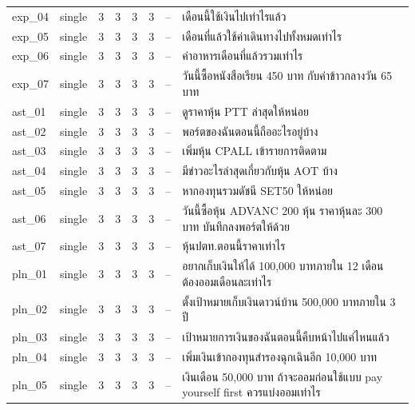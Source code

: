 \documentclass[11pt,a4paper]{article}
\begin{document}
{\begin{longtable}{llrrrrrp{7.2cm}}
exp\_\allowbreak{}04 & single & 3 & 3 & 3 & 3 & -- & {\thaifont เดือนนี้ใช้เงินไปเท่าไรแล้ว} \\
exp\_\allowbreak{}05 & single & 3 & 3 & 3 & 3 & -- & {\thaifont เดือนที่แล้วใช้ค่าเดินทางไปทั้งหมดเท่าไร} \\
exp\_\allowbreak{}06 & single & 3 & 3 & 3 & 3 & -- & {\thaifont ค่าอาหารเดือนที่แล้วรวมเท่าไร} \\
exp\_\allowbreak{}07 & single & 3 & 3 & 3 & 3 & -- & {\thaifont วันนี้ซื้อหนังสือเรียน }450 {\thaifont บาท กับค่าข้าวกลางวัน }65 {\thaifont บาท} \\
ast\_\allowbreak{}01 & single & 3 & 3 & 3 & 3 & -- & {\thaifont ดูราคาหุ้น }PTT {\thaifont ล่าสุดให้หน่อย} \\
ast\_\allowbreak{}02 & single & 3 & 3 & 3 & 3 & -- & {\thaifont พอร์ตของฉันตอนนี้ถืออะไรอยู่บ้าง} \\
ast\_\allowbreak{}03 & single & 3 & 3 & 3 & 3 & -- & {\thaifont เพิ่มหุ้น }CPALL {\thaifont เข้ารายการติดตาม} \\
ast\_\allowbreak{}04 & single & 3 & 3 & 3 & 3 & -- & {\thaifont มีข่าวอะไรล่าสุดเกี่ยวกับหุ้น }AOT {\thaifont บ้าง} \\
ast\_\allowbreak{}05 & single & 3 & 3 & 3 & 3 & -- & {\thaifont หากองทุนรวมดัชนี }SET50 {\thaifont ให้หน่อย} \\
ast\_\allowbreak{}06 & single & 3 & 3 & 3 & 3 & -- & {\thaifont วันนี้ซื้อหุ้น }ADVANC 200 {\thaifont หุ้น ราคาหุ้นละ }300 {\thaifont บาท บันทึกลงพอร์ตให้ด้วย} \\
ast\_\allowbreak{}07 & single & 3 & 3 & 3 & 3 & -- & {\thaifont หุ้นปตท}.{\thaifont ตอนนี้ราคาเท่าไร} \\
pln\_\allowbreak{}01 & single & 3 & 3 & 3 & 3 & -- & {\thaifont อยากเก็บเงินให้ได้ }100,000 {\thaifont บาทภายใน }12 {\thaifont เดือน ต้องออมเดือนละเท่าไร} \\
pln\_\allowbreak{}02 & single & 3 & 3 & 3 & 3 & -- & {\thaifont ตั้งเป้าหมายเก็บเงินดาวน์บ้าน }500,000 {\thaifont บาทภายใน }3 {\thaifont ปี} \\
pln\_\allowbreak{}03 & single & 3 & 3 & 3 & 3 & -- & {\thaifont เป้าหมายการเงินของฉันตอนนี้คืบหน้าไปแค่ไหนแล้ว} \\
pln\_\allowbreak{}04 & single & 3 & 3 & 3 & 3 & -- & {\thaifont เพิ่มเงินเข้ากองทุนสำรองฉุกเฉินอีก }10,000 {\thaifont บาท} \\
pln\_\allowbreak{}05 & single & 3 & 3 & 3 & 3 & -- & {\thaifont เงินเดือน }50,000 {\thaifont บาท ถ้าจะออมก่อนใช้แบบ }pay yourself first {\thaifont ควรแบ่งออมเท่าไร} \\

\end{longtable}}
\end{document}
